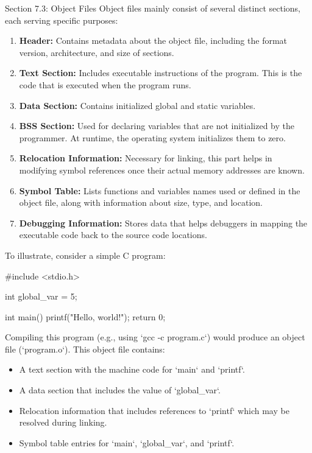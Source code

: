 \begin{notes}{Section 7.3: Object Files}
    Object files mainly consist of several distinct sections, each serving specific purposes:
    \begin{enumerate}
        \item \textbf{Header:} Contains metadata about the object file, including the format version, architecture, and size of sections.
        \item \textbf{Text Section:} Includes executable instructions of the program. This is the code that is executed when the program runs.
        \item \textbf{Data Section:} Contains initialized global and static variables.
        \item \textbf{BSS Section:} Used for declaring variables that are not initialized by the programmer. At runtime, the operating system initializes them to zero.
        \item \textbf{Relocation Information:} Necessary for linking, this part helps in modifying symbol references once their actual memory addresses are known.
        \item \textbf{Symbol Table:} Lists functions and variables names used or defined in the object file, along with information about size, type, and location.
        \item \textbf{Debugging Information:} Stores data that helps debuggers in mapping the executable code back to the source code locations.
    \end{enumerate}

    \begin{highlight}
        To illustrate, consider a simple C program:
    \begin{code}[C]
    #include <stdio.h>
    
    int global_var = 5;
    
    int main() {
        printf("Hello, world!\n");
        return 0;
    }
    \end{code}
        Compiling this program (e.g., using `gcc -c program.c`) would produce an object file (`program.o`). This object file contains:
        \begin{itemize}
            \item A text section with the machine code for `main` and `printf`.
            \item A data section that includes the value of `global\_var`.
            \item Relocation information that includes references to `printf` which may be resolved during linking.
            \item Symbol table entries for `main`, `global\_var`, and `printf`.
        \end{itemize}
    \end{highlight}
    

\end{notes}
